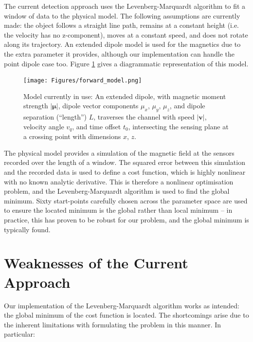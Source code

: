 \documentclass[10pt, a4paper, twocolumn]{article} %
\begin{document}
The current detection approach uses the Levenberg-Marquardt algorithm to fit a window of data to the physical model. The following assumptions are currently made: the object follows a straight line path, remains at a constant height (i.e. the velocity has no z-component), moves at a constant speed, and does not rotate along its trajectory. An extended dipole model is used for the magnetics due to the extra parameter it provides, although our implementation can handle the point dipole case too. Figure \ref{forward_model} gives a diagrammatic representation of this model.

\begin{figure}
	\texttt{[image: Figures/forward\_model.png]} %
	\caption{Model currently in use: An extended dipole, with magnetic moment strength $|\boldsymbol{\mu}|$, dipole vector components $\mu_x$, $\mu_y$, $\mu_z$, and dipole separation (“length”) $L$, traverses the channel with speed $|\mathbf{v}|$, velocity angle $v_q$, and time offset $t_0$, intersecting the sensing plane at a crossing point with dimensions $x$, $z$.}
	\label{forward_model}
\end{figure}

The physical model provides a simulation of the magnetic field at the sensors recorded over the length of a window. The squared error between this simulation and the recorded data is used to define a cost function, which is highly nonlinear with no known analytic derivative. This is therefore a nonlinear optimisation problem, and the Levenberg-Marquardt algorithm is used to find the global minimum. Sixty start-points carefully chosen across the parameter space are used to ensure the located minimum is the global rather than local minimum – in practice, this has proven to be robust for our problem, and the global minimum is typically found.

\section{Weaknesses of the Current Approach}

Our implementation of the Levenberg-Marquardt algorithm works as intended: the global minimum of the cost function is located. The shortcomings arise due to the inherent limitations with formulating the problem in this manner. In particular:
\end{document}
